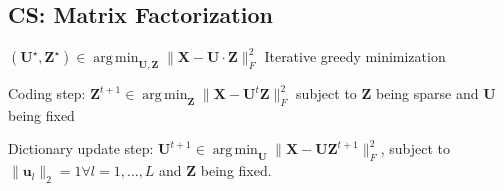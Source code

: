 \documentclass[a4paper, 11pt, landscape]{article}
\DeclareMathOperator*{\argmin}{arg\,min}
\DeclareMathOperator*{\argmax}{arg\,max}
\begin{document}
\begin{multicols*}{3}
\subsection{CS: Matrix Factorization}
$(\mathbf{U}^\star, \mathbf{Z}^\star) \in \argmin_\mathbf{U,Z} \| \mathbf{X} - \mathbf{U} \cdot \mathbf{Z} \|_F^2$
Iterative greedy minimization
\begin{inparaenum}
  \item Coding step: $\mathbf{Z}^{t+1} \in \argmin_\mathbf{Z} \| \mathbf{X} - \mathbf{U}^t \mathbf{Z} \|_F^2$ subject to $\mathbf{Z}$ being sparse and $\mathbf{U}$ being fixed
  \item Dictionary update step: $\mathbf{U}^{t+1} \in \argmin_\mathbf{U} \| \mathbf{X} - \mathbf{UZ}^{t+1} \|_F^2$, subject to $\|\mathbf{u}_l\|_2 = 1 \forall l=1,\dots,L$ and $\mathbf{Z}$ being fixed.
\end{inparaenum}




\end{multicols*}
\end{document}
